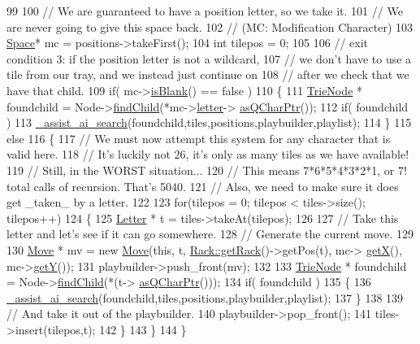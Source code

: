 \begin{DoxyCode}
99 
100     \textcolor{comment}{// We are guaranteed to have a position letter, so we take it.}
101     \textcolor{comment}{// We are never going to give this space back.}
102     \textcolor{comment}{// (MC: Modification Character)}
103     \hyperlink{class_space}{Space}* mc = positions->takeFirst();
104     \textcolor{keywordtype}{int} tilepos = 0;
105 
106     \textcolor{comment}{// exit condition 3: if the position letter is not a wildcard,}
107     \textcolor{comment}{// we don't have to use a tile from our tray, and we instead just continue on}
108     \textcolor{comment}{// after we check that we have that child.}
109     \textcolor{keywordflow}{if}( mc->\hyperlink{class_space_a308f0ef400183df78df69717ca50cfee}{isBlank}() == false )
110     \{
111         \hyperlink{class_trie_node}{TrieNode} * foundchild = Node->\hyperlink{class_trie_node_a1b5c7d87ce28b9aa7d0bcbfe33868bbc}{findChild}(*mc->\hyperlink{class_space_ab899363fba4ab54c907df80a99e8e563}{letter}->
      \hyperlink{class_letter_aa7fb6547b5ceefef8d0a014ab0a80d08}{asQCharPtr}());
112         \textcolor{keywordflow}{if}( foundchild )
113             \hyperlink{class_a_i_player_afdf893cf47209d106740f56c1d37c334}{\_assist\_ai\_search}(foundchild,tiles,positions,playbuilder,playlist);
114     \}
115     \textcolor{keywordflow}{else}
116     \{
117         \textcolor{comment}{// We must now attempt this system for any character that is valid here.}
118         \textcolor{comment}{// It's luckily not 26, it's only as many tiles as we have available!}
119         \textcolor{comment}{// Still, in the WORST situation...}
120         \textcolor{comment}{// This means 7*6*5*4*3*2*1, or 7! total calls of recursion. That's 5040.}
121         \textcolor{comment}{// Also, we need to make sure it does get \_taken\_ by a letter.}
122 
123         \textcolor{keywordflow}{for}(tilepos = 0; tilepos < tiles->size(); tilepos++)
124         \{
125             \hyperlink{class_letter}{Letter} * t = tiles->takeAt(tilepos);
126 
127             \textcolor{comment}{// Take this letter and let's see if it can go somewhere.}
128             \textcolor{comment}{// Generate the current move.}
129 
130             \hyperlink{class_move}{Move} * mv = \textcolor{keyword}{new} \hyperlink{class_move}{Move}(\textcolor{keyword}{this}, t, \hyperlink{class_rack_aa48de650c15bda8267451d84caf6ea3f}{Rack::getRack}()->getPos(t), mc->
      \hyperlink{class_space_a65828dd5c8d2799dadab676c1d52bdfa}{getX}(), mc->\hyperlink{class_space_ac12e951586a96323b1db8cf1e5a827a9}{getY}());
131             playbuilder->push\_front(mv);
132 
133             \hyperlink{class_trie_node}{TrieNode} * foundchild = Node->\hyperlink{class_trie_node_a1b5c7d87ce28b9aa7d0bcbfe33868bbc}{findChild}(*(t->
      \hyperlink{class_letter_aa7fb6547b5ceefef8d0a014ab0a80d08}{asQCharPtr}()));
134             \textcolor{keywordflow}{if}( foundchild )
135             \{
136                 \hyperlink{class_a_i_player_afdf893cf47209d106740f56c1d37c334}{\_assist\_ai\_search}(foundchild,tiles,positions,playbuilder,playlist);
137             \}
138 
139             \textcolor{comment}{// And take it out of the playbuilder.}
140             playbuilder->pop\_front();
141             tiles->insert(tilepos,t);
142         \}
143     \}
144 \}
\end{DoxyCode}
